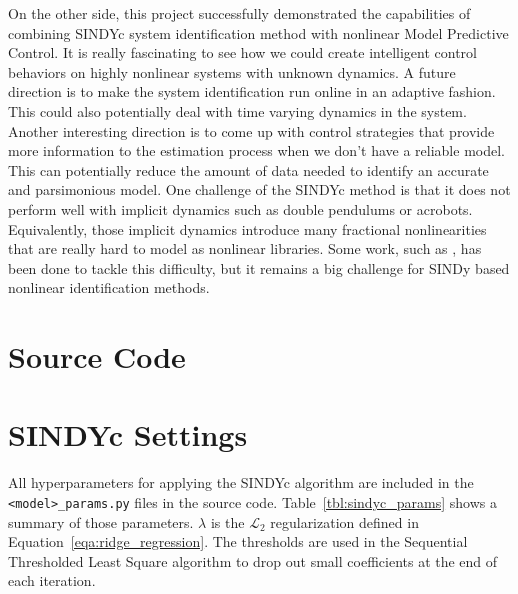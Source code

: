 \documentclass[10pt,twocolumn]{article}
\begin{document}
On the other side, this project successfully demonstrated
the capabilities of combining SINDYc system identification method with nonlinear
Model Predictive Control. It is really fascinating to see how we could create intelligent control
behaviors on highly nonlinear systems with unknown dynamics. A future direction is to make
the system identification run online in an adaptive fashion. This could also potentially deal
with time varying dynamics in the system. Another interesting direction is to come up
with control strategies that provide more information to the estimation process when
we don't have a reliable model. This can potentially reduce the amount of data needed to
identify an accurate and parsimonious model. One challenge of the SINDYc method is that
it does not perform well with implicit dynamics such as double pendulums or acrobots.
Equivalently, those implicit dynamics introduce many fractional nonlinearities that
are really hard to model as nonlinear libraries. Some work, such as \cite{implicitsindy},
has been done to tackle this difficulty, but it remains a big challenge for SINDy based
nonlinear identification methods.

\newpage



\newpage
\onecolumn
\appendix
\appendixpage

\section{Source Code}

\section{SINDYc Settings}\label{sec:hyper_sindy}

All hyperparameters for applying the SINDYc algorithm are included
in the \texttt{<model>\_params.py} files in the source code. Table~\ref{tbl:sindyc_params}
shows a summary of those parameters. $\lambda$ is the $\mathcal{L}_2$ regularization
defined in Equation~\ref{eqa:ridge_regression}. The thresholds are used in the
Sequential Thresholded Least Square algorithm to drop out small coefficients at the end of
each iteration.
\end{document}
